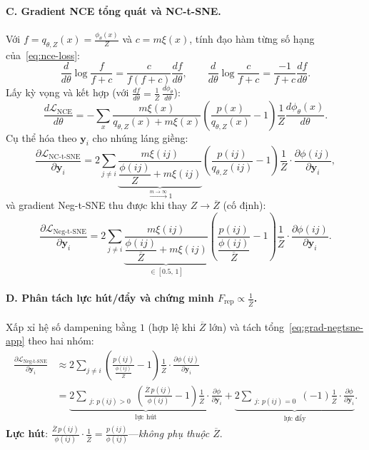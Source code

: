 \paragraph{C. Gradient NCE tổng quát và NC-t-SNE.}
Với $f = q_{\theta,Z}(x) = \frac{\phi_\theta(x)}{Z}$ và $c = m\xi(x)$, tính đạo hàm từng số hạng của~\eqref{eq:nce-loss}:
\[
  \frac{d}{d\theta}\log\frac{f}{f+c} = \frac{c}{f(f+c)}\frac{df}{d\theta},
  \qquad
  \frac{d}{d\theta}\log\frac{c}{f+c} = \frac{-1}{f+c}\frac{df}{d\theta}.
\]
Lấy kỳ vọng và kết hợp (với $\frac{df}{d\theta} = \frac{1}{Z}\,\frac{d\phi_\theta}{d\theta}$):
\begin{equation}
  \frac{d\mathcal{L}_{\text{NCE}}}{d\theta}
  = -\sum_x\frac{m\xi(x)}{q_{\theta,Z}(x) + m\xi(x)}\left(\frac{p(x)}{q_{\theta,Z}(x)} - 1\right)
    \frac{1}{Z}\frac{d\phi_\theta(x)}{d\theta}.
  \label{eq:nce-grad-general}
\end{equation}
Cụ thể hóa theo $\mathbf{y}_i$ cho nhúng láng giềng:
\begin{equation}
  \frac{\partial\mathcal{L}_{\text{NC-t-SNE}}}{\partial\mathbf{y}_i}
  = 2\sum_{j \neq i}\underbrace{\dfrac{m\xi(ij)}{\dfrac{\phi(ij)}{Z} + m\xi(ij)}}_{\xrightarrow{m\to\infty} 1}
    \!\left(\frac{p(ij)}{q_{\theta,Z}(ij)} - 1\right)\frac{1}{Z}
    \cdot\frac{\partial\phi(ij)}{\partial\mathbf{y}_i},
  \label{eq:grad-nctsne-app}
\end{equation}
và gradient Neg-t-SNE thu được khi thay $Z \to \overline{Z}$ (cố định):
\begin{equation}
  \frac{\partial\mathcal{L}_{\text{Neg-t-SNE}}}{\partial\mathbf{y}_i}
  = 2\sum_{j \neq i}\underbrace{\dfrac{m\xi(ij)}{\dfrac{\phi(ij)}{\overline{Z}} + m\xi(ij)}}_{\in[0.5,\,1]}
    \!\left(\dfrac{p(ij)}{\dfrac{\phi(ij)}{\overline{Z}}} - 1\right)\dfrac{1}{\overline{Z}}
    \cdot\dfrac{\partial\phi(ij)}{\partial\mathbf{y}_i}.
  \label{eq:grad-negtsne-app}
\end{equation}

\paragraph{D. Phân tách lực hút/đẩy và chứng minh $F_{\text{rep}} \propto \frac{1}{\overline{Z}}$.}
Xấp xỉ hệ số dampening bằng $1$ (hợp lệ khi $\overline{Z}$ lớn) và tách tổng~\eqref{eq:grad-negtsne-app} theo hai nhóm:
\begin{align*}
  \frac{\partial\mathcal{L}_{\text{Neg-t-SNE}}}{\partial\mathbf{y}_i}
  &\approx 2\sum_{j\neq i}\!\left(\frac{p(ij)}{\frac{\phi(ij)}{\overline{Z}}} - 1\right)\frac{1}{\overline{Z}}
    \cdot\frac{\partial\phi(ij)}{\partial\mathbf{y}_i}\\
  &= \underbrace{2\sum_{\substack{j:\,p(ij)>0}}\!\left(\frac{\overline{Z}\,p(ij)}{\phi(ij)}-1\right)
      \frac{1}{\overline{Z}}\cdot\frac{\partial\phi}{\partial\mathbf{y}_i}}_{\text{lực hút}}
  + \underbrace{2\sum_{\substack{j:\,p(ij)=0}}\!\left(-1\right)
      \frac{1}{\overline{Z}}\cdot\frac{\partial\phi}{\partial\mathbf{y}_i}}_{\text{lực đẩy}}.
\end{align*}
\textbf{Lực hút}: $\frac{\overline{Z}\,p(ij)}{\phi(ij)}\cdot\frac{1}{\overline{Z}} = \frac{p(ij)}{\phi(ij)}$---\emph{không phụ thuộc $\overline{Z}$}.

